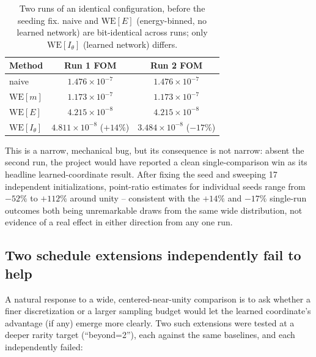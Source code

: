 \documentclass[a4paper,fleqn]{cas-sc}
\newcommand{\WE}{\mathrm{WE}}
\begin{document}
\begin{table}[h]
\centering
\caption{Two runs of an identical configuration, before the seeding fix.
naive and $\WE[E]$ (energy-binned, no learned network) are bit-identical
across runs; only $\WE[I_\theta]$ (learned network) differs.}
\label{tab:seedbug}
\begin{tabular}{lcc}
\toprule
Method & Run 1 FOM & Run 2 FOM \\
\midrule
naive & $1.476\times10^{-7}$ & $1.476\times10^{-7}$ \\
$\WE[m]$ & $1.173\times10^{-7}$ & $1.173\times10^{-7}$ \\
$\WE[E]$ & $4.215\times10^{-8}$ & $4.215\times10^{-8}$ \\
$\WE[I_\theta]$ & $4.811\times10^{-8}$ ($+14\%$) & $3.484\times10^{-8}$ ($-17\%$) \\
\bottomrule
\end{tabular}
\end{table}

This is a narrow, mechanical bug, but its consequence is not narrow: absent
the second run, the project would have reported a clean single-comparison
win as its headline learned-coordinate result. After fixing the seed and
sweeping 17 independent initializations, point-ratio estimates for
individual seeds range from $-52\%$ to $+112\%$ around unity -- consistent
with the $+14\%$ and $-17\%$ single-run outcomes both being unremarkable
draws from the same wide distribution, not evidence of a real effect in
either direction from any one run.

\subsection{Two schedule extensions independently fail to help}

A natural response to a wide, centered-near-unity comparison is to ask
whether a finer discretization or a larger sampling budget would let the
learned coordinate's advantage (if any) emerge more clearly. Two such
extensions were tested at a deeper rarity target (``beyond=2''), each
against the same baselines, and each independently failed:
\end{document}

